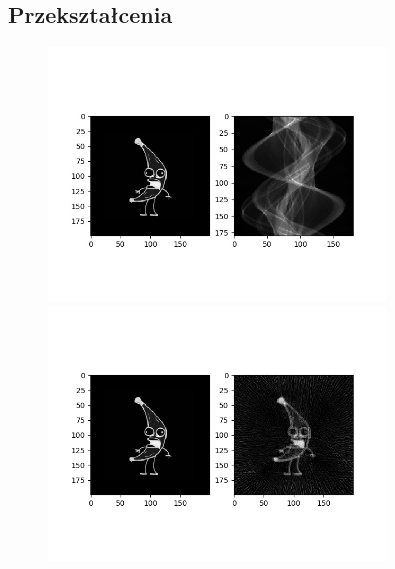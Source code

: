 \documentclass{article}
\begin{document}
\subsection{Przekształcenia}
\begin{figure}[H]
\begin{center}
\includegraphics[width=0.8\textwidth]{./banana/sinogram.jpg}
\includegraphics[width=0.8\textwidth]{./banana/reconstructedPicture2.png}
\end{center}
\end{figure}
\end{document}
